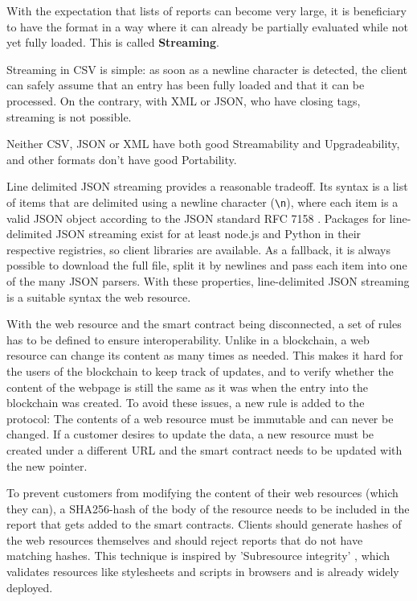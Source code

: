 With the expectation that lists of reports can become very large, it is beneficiary to have the format in a way where it can already be partially evaluated while not yet fully loaded. This is called \textbf{Streaming}.

Streaming in CSV is simple: as soon as a newline character is detected, the client can safely assume that an entry has been fully loaded and that it can be processed. On the contrary, with XML or JSON, who have closing tags, streaming is not possible.

Neither CSV, JSON or XML have both good Streamability and Upgradeability, and other formats don't have good Portability.

Line delimited JSON streaming \cite{LineDelimitedJSON} provides a reasonable tradeoff. Its syntax is a list of items that are delimited using a newline character (\texttt{{\textbackslash}n}), where each item is a valid JSON object according to the JSON standard RFC 7158 \cite{RFC7158}. Packages for line-delimited JSON streaming exist for at least node.js and Python in their respective registries, so client libraries are available. As a fallback, it is always possible to download the full file, split it by newlines and pass each item into one of the many JSON parsers.
With these properties, line-delimited JSON streaming is a suitable syntax the web resource.

With the web resource and the smart contract being disconnected, a set of rules has to be defined to ensure interoperability. Unlike in a blockchain, a web resource can change its content as many times as needed. This makes it hard for the users of the blockchain to keep track of updates, and to verify whether the content of the webpage is still the same as it was when the entry into the blockchain was created. To avoid these issues, a new rule is added to the protocol: The contents of a web resource must be immutable and can never be changed. If a customer desires to update the data, a new resource must be created under a different URL and the smart contract needs to be updated with the new pointer.

To prevent customers from modifying the content of their web resources (which they can), a SHA256-hash of the body of the resource needs to be included in the report that gets added to the smart contracts. Clients should generate hashes of the web resources themselves and should reject reports that do not have matching hashes.
This technique is inspired by 'Subresource integrity' \cite{SubresourceIntegrity}, which validates resources like stylesheets and scripts in browsers and is already widely deployed.

